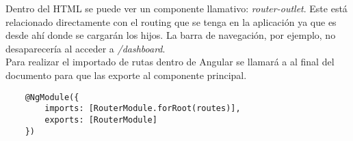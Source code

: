 Dentro del HTML se puede ver un componente llamativo: \textit{router-outlet}. Este está relacionado directamente con el routing que se tenga en la aplicación ya que es desde ahí donde se cargarán los hijos. La barra de navegación, por ejemplo, no desaparecería al acceder a \textit{/dashboard}.
\\Para realizar el importado de rutas dentro de Angular se llamará a \textit{\makeatletter@NgModule} al final del documento para que las exporte al componente principal.
\begin{verbatim}
    @NgModule({
        imports: [RouterModule.forRoot(routes)],
        exports: [RouterModule]
    })
\end{verbatim}